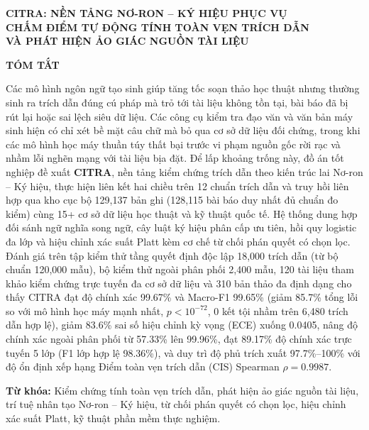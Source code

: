 \clearpage
\pagestyle{empty}
\begin{vietnamese}
{\centering
\thispagestyle{empty}
\linespread{1.15}\fontsize{16pt}{22pt}\selectfont\textbf{CITRA: NỀN TẢNG NƠ-RON -- KÝ HIỆU PHỤC VỤ\\CHẤM ĐIỂM TỰ ĐỘNG TÍNH TOÀN VẸN TRÍCH DẪN\\VÀ PHÁT HIỆN ẢO GIÁC NGUỒN TÀI LIỆU}\par}

\vspace{0.35\baselineskip}

{\centering\linespread{1.15}\fontsize{16pt}{22pt}\selectfont\textbf{TÓM TẮT}\par}

\vspace{0.45\baselineskip}
\thispagestyle{empty}

Các mô hình ngôn ngữ tạo sinh giúp tăng tốc soạn thảo học thuật nhưng thường sinh ra trích dẫn đúng cú pháp mà trỏ tới tài liệu không tồn tại, bài báo đã bị rút lại hoặc sai lệch siêu dữ liệu. Các công cụ kiểm tra đạo văn và văn bản máy sinh hiện có chỉ xét bề mặt câu chữ mà bỏ qua cơ sở dữ liệu đối chứng, trong khi các mô hình học máy thuần túy thất bại trước vi phạm nguồn gốc rời rạc và nhầm lỗi nghẽn mạng với tài liệu bịa đặt. Để lấp khoảng trống này, đồ án tốt nghiệp đề xuất \textbf{CITRA}, nền tảng kiểm chứng trích dẫn theo kiến trúc lai Nơ-ron -- Ký hiệu, thực hiện liên kết hai chiều trên 12 chuẩn trích dẫn và truy hồi liên hợp qua kho cục bộ 129,137 bản ghi (128,115 bài báo duy nhất đủ chuẩn đo kiểm) cùng 15+ cơ sở dữ liệu học thuật và kỹ thuật quốc tế. Hệ thống dung hợp đối sánh ngữ nghĩa song ngữ, cây luật ký hiệu phân cấp ưu tiên, hồi quy logistic đa lớp và hiệu chỉnh xác suất Platt kèm cơ chế từ chối phán quyết có chọn lọc. Đánh giá trên tập kiểm thử tầng quyết định độc lập 18,000 trích dẫn (từ bộ chuẩn 120,000 mẫu), bộ kiểm thử ngoài phân phối 2,400 mẫu, 120 tài liệu tham khảo kiểm chứng trực tuyến đa cơ sở dữ liệu và 310 bản thảo đa định dạng cho thấy CITRA đạt độ chính xác 99.67\% và Macro-F1 99.65\% (giảm 85.7\% tổng lỗi so với mô hình học máy mạnh nhất, $p < 10^{-72}$, 0 kết tội nhầm trên 6,480 trích dẫn hợp lệ), giảm 83.6\% sai số hiệu chỉnh kỳ vọng (ECE) xuống 0.0405, nâng độ chính xác ngoài phân phối từ 57.33\% lên 99.96\%, đạt 89.17\% độ chính xác trực tuyến 5 lớp (F1 lớp hợp lệ 98.36\%), và duy trì độ phủ trích xuất 97.7\%--100\% với độ ổn định xếp hạng Điểm toàn vẹn trích dẫn (CIS) Spearman $\rho = 0.9987$.

\vspace{0.35\baselineskip}
\noindent\textbf{Từ khóa:} Kiểm chứng tính toàn vẹn trích dẫn, phát hiện ảo giác nguồn tài liệu, trí tuệ nhân tạo Nơ-ron -- Ký hiệu, từ chối phán quyết có chọn lọc, hiệu chỉnh xác suất Platt, kỹ thuật phần mềm thực nghiệm.
\end{vietnamese}
\clearpage

